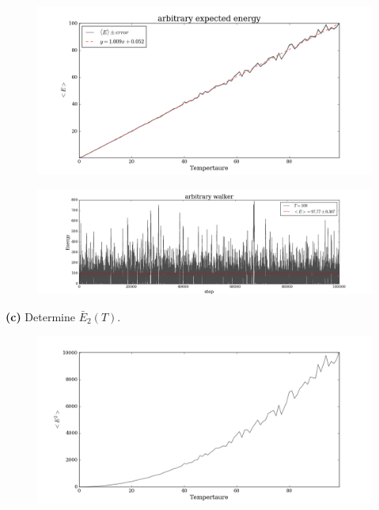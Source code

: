 \documentclass{article}
\begin{document}
\begin{figure}[H]
\begin{center}
\includegraphics[width=16cm]{../output/arbitrary/expected.png} 
\end{center}
\end{figure}

\begin{figure}[H]
\begin{center}
\includegraphics[width=16cm]{../output/arbitrary/walkers.png} 
\end{center}
\end{figure}

\textbf{(c)} Determine $\bar{E}_{2}(T)$. 

\begin{figure}[H]
\begin{center}
\includegraphics[width=16cm]{../output/arbitrary/expected_sq.png} 
\end{center}
\end{figure}
\end{document}
